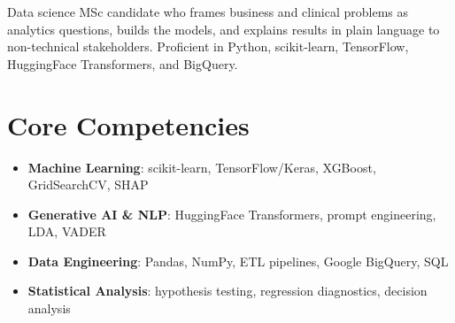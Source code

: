 \documentclass[11pt,a4paper,sans]{moderncv}
\begin{document}
\makecvtitle


\vspace{2pt}
\small{Data science MSc candidate who frames business and clinical problems as analytics questions, builds the models, and explains results in plain language to non-technical stakeholders. Proficient in Python, scikit-learn, TensorFlow, HuggingFace Transformers, and BigQuery.}


\section{Core Competencies}
\vspace{1pt}
\begin{itemize}

\item \textbf{Machine Learning}: scikit-learn, TensorFlow/Keras, XGBoost, GridSearchCV, SHAP

\item \textbf{Generative AI \& NLP}: HuggingFace Transformers, prompt engineering, LDA, VADER

\item \textbf{Data Engineering}: Pandas, NumPy, ETL pipelines, Google BigQuery, SQL

\item \textbf{Statistical Analysis}: hypothesis testing, regression diagnostics, decision analysis

\end{itemize}

\end{document}
